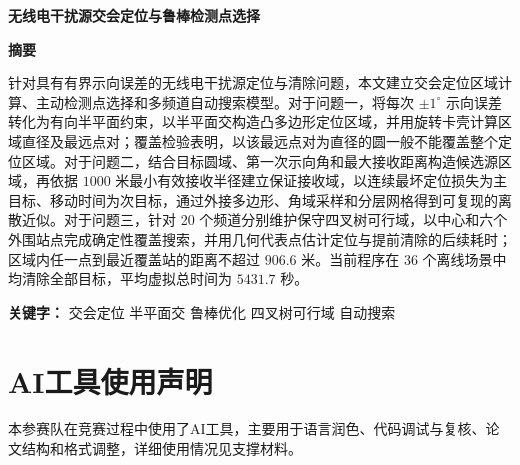 \documentclass[fontset=windows, 11pt, a4paper]{ctexart}
\newcommand{\papertitle}[1]{%
  \thispagestyle{empty}%
  \begin{center}
    {\fontsize{17.3pt}{21pt}\bfseries #1}
  \end{center}
  \vspace{0.45em}
}
\newcommand{\abstractcn}[2]{%
  \thispagestyle{empty}%
  \begin{center}{\fontsize{14pt}{17pt}\bfseries 摘要}\end{center}
  #1\par
  \vspace{1em}
  {\heiti\bfseries 关键字：}#2\par
  \newpage
}
\newcommand{\referencescn}{%
}
\newcommand{\appendixcn}{%
}
\begin{document}
\papertitle{无线电干扰源交会定位与鲁棒检测点选择}

\abstractcn{%
  针对具有有界示向误差的无线电干扰源定位与清除问题，本文建立交会定位区域计算、主动检测点选择和多频道自动搜索模型。对于问题一，将每次 $\pm1^\circ$ 示向误差转化为有向半平面约束，以半平面交构造凸多边形定位区域，并用旋转卡壳计算区域直径及最远点对；覆盖检验表明，以该最远点对为直径的圆一般不能覆盖整个定位区域。对于问题二，结合目标圆域、第一次示向角和最大接收距离构造候选源区域，再依据 $1000$ 米最小有效接收半径建立保证接收域，以连续最坏定位损失为主目标、移动时间为次目标，通过外接多边形、角域采样和分层网格得到可复现的离散近似。对于问题三，针对 20 个频道分别维护保守四叉树可行域，以中心和六个外围站点完成确定性覆盖搜索，并用几何代表点估计定位与提前清除的后续耗时；区域内任一点到最近覆盖站的距离不超过 $906.6$ 米。当前程序在 36 个离线场景中均清除全部目标，平均虚拟总时间为 $5431.7$ 秒。%
}{%
  交会定位 \quad 半平面交 \quad 鲁棒优化 \quad 四叉树可行域 \quad 自动搜索%
}







\clearpage

% 
% 

\newpage
\section*{AI工具使用声明}
本参赛队在竞赛过程中使用了AI工具，主要用于语言润色、代码调试与复核、论文结构和格式调整，详细使用情况见支撑材料。

\vspace{1.2em}
\referencescn

\clearpage
\appendixcn
\end{document}
